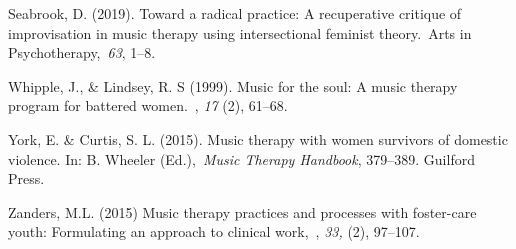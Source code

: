 \documentclass[authordate, empirical]{jote-new-article}
\begin{document}
Seabrook, D. (2019). Toward a radical practice: A recuperative critique of improvisation in music therapy using intersectional feminist theory. Arts in Psychotherapy, \emph{63}, 1--8.







Whipple, J., \& Lindsey, R. S (1999). Music for the soul: A music therapy program for battered women. , \emph{17} (2), 61--68.







York, E. \& Curtis, S. L. (2015). Music therapy with women survivors of domestic violence. In: B. Wheeler (Ed.), \emph{Music Therapy Handbook}, 379--389. Guilford Press.







Zanders, M.L. (2015) Music therapy practices and processes with foster-care youth: Formulating an approach to clinical work, , \emph{33,} (2), 97--107.
\end{document}
